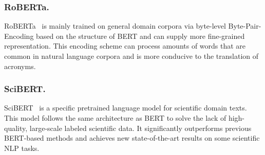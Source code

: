 \subsubsection{RoBERTa.}
RoBERTa~\cite{liu2019roberta} is mainly trained on general domain corpora via byte-level Byte-Pair-Encoding \cite{sennrich2016neural} based on the structure of BERT and can supply more fine-grained representation.
This encoding scheme can process amounts of words that are common in natural language corpora and is more conducive to the translation of acronyms.

\subsubsection{SciBERT.}

SciBERT~\cite{Beltagy2019SciBERT} is a specific pretrained language model for scientific domain texts. This model follows the same architecture as BERT to solve the lack of high-quality, large-scale labeled scientific data. It significantly outperforms previous BERT-based methods and achieves new state-of-the-art results on some scientific NLP tasks.

